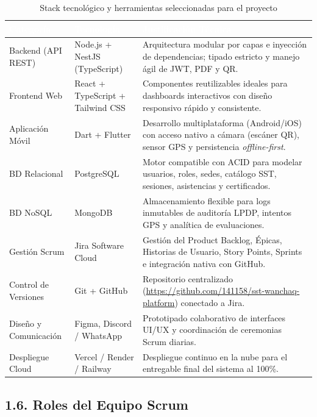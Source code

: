 \documentclass[11pt,a4paper]{article}
\begin{document}
\begin{table}[H]
\centering
\caption{Stack tecnológico y herramientas seleccionadas para el proyecto}
\label{tab:stack}
\renewcommand{\arraystretch}{1.25}
\small
\begin{tabularx}{\textwidth}{L{3.4cm} L{4.0cm} Y}
\toprule
{}
\textcolor{white}{\textbf{Categoría}} & \textcolor{white}{\textbf{Tecnología}} & \textcolor{white}{\textbf{Justificación Técnica}} \\
\midrule
Backend (API REST) & Node.js + NestJS (TypeScript) & Arquitectura modular por capas e inyección de dependencias; tipado estricto y manejo ágil de JWT, PDF y QR. \\
Frontend Web & React + TypeScript + Tailwind CSS & Componentes reutilizables ideales para dashboards interactivos con diseño responsivo rápido y consistente. \\
Aplicación Móvil & Dart + Flutter & Desarrollo multiplataforma (Android/iOS) con acceso nativo a cámara (escáner QR), sensor GPS y persistencia \textit{offline-first}. \\
BD Relacional & PostgreSQL & Motor compatible con ACID para modelar usuarios, roles, sedes, catálogo SST, sesiones, asistencias y certificados. \\
BD NoSQL & MongoDB & Almacenamiento flexible para logs inmutables de auditoría LPDP, intentos GPS y analítica de evaluaciones. \\
Gestión Scrum & Jira Software Cloud & Gestión del Product Backlog, Épicas, Historias de Usuario, Story Points, Sprints e integración nativa con GitHub. \\
Control de Versiones & Git + GitHub & Repositorio centralizado (\url{https://github.com/141158/sst-wanchaq-platform}) conectado a Jira. \\
Diseño y Comunicación & Figma, Discord / WhatsApp & Prototipado colaborativo de interfaces UI/UX y coordinación de ceremonias Scrum diarias. \\
Despliegue Cloud & Vercel / Render / Railway & Despliegue continuo en la nube para el entregable final del sistema al 100\%. \\
\bottomrule
\end{tabularx}
\end{table}

\subsection*{1.6. Roles del Equipo Scrum}
\end{document}
